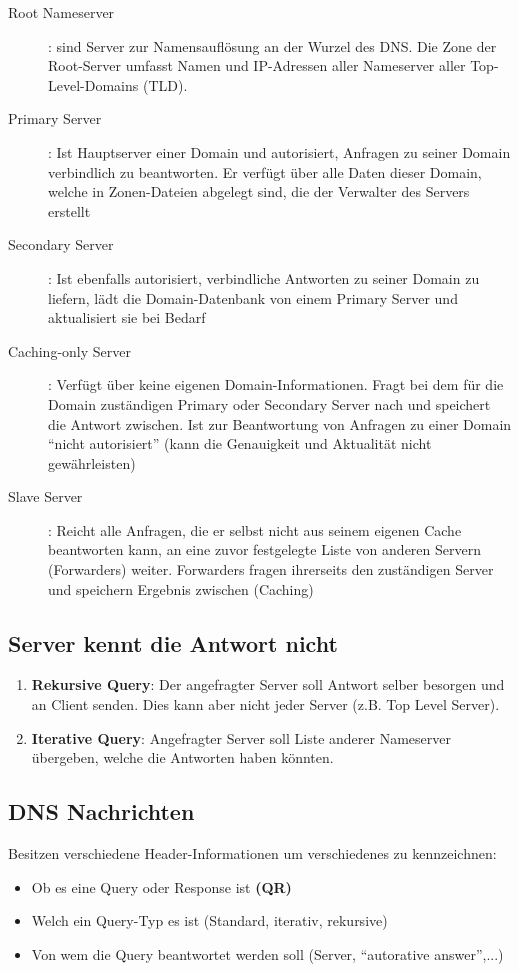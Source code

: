 \documentclass{article} %
\begin{document}
\begin{description}
\item[Root Nameserver]: sind Server zur Namensauflösung an der Wurzel des DNS. Die Zone der Root-Server umfasst Namen und IP-Adressen aller Nameserver aller Top-Level-Domains (TLD).
\item[Primary Server]: Ist Hauptserver einer Domain und autorisiert, Anfragen zu seiner Domain verbindlich zu
beantworten.
Er verfügt über alle Daten dieser Domain, welche in Zonen-Dateien abgelegt sind, die der Verwalter des
Servers erstellt
\item[Secondary Server]: Ist ebenfalls autorisiert, verbindliche Antworten zu seiner
Domain zu liefern, lädt die Domain-Datenbank von einem Primary Server und aktualisiert sie bei Bedarf
\item[Caching-only Server]: Verfügt über keine eigenen Domain-Informationen.
Fragt bei dem für die Domain zuständigen Primary oder Secondary Server nach und speichert die Antwort zwischen.
Ist zur Beantwortung von Anfragen zu einer Domain "`nicht autorisiert"' (kann die Genauigkeit und Aktualität nicht gewährleisten)
\item[Slave	Server]: Reicht alle Anfragen, die er selbst nicht aus seinem eigenen Cache beantworten kann, an eine zuvor festgelegte Liste von anderen Servern (Forwarders) weiter.
Forwarders fragen ihrerseits den zuständigen Server und speichern Ergebnis zwischen (Caching)
\end{description}

\subsection{Server kennt die Antwort nicht}
\begin{enumerate}
\item \textbf{Rekursive Query}: Der angefragter Server soll Antwort selber besorgen und an Client senden. Dies kann aber nicht jeder Server (z.B. Top Level Server).
\item \textbf{Iterative Query}: Angefragter Server soll Liste anderer Nameserver übergeben, welche die Antworten haben könnten.
\end{enumerate}
\subsection{DNS Nachrichten}
Besitzen verschiedene Header-Informationen um verschiedenes zu kennzeichnen:
	\begin{itemize}
	\item Ob es eine Query oder Response ist \textbf{(QR)}
	\item Welch ein Query-Typ es ist (Standard, iterativ, rekursive)
	\item Von wem die Query beantwortet werden soll (Server, "`autorative answer"',...)
	\end{itemize}
	
\end{document}
